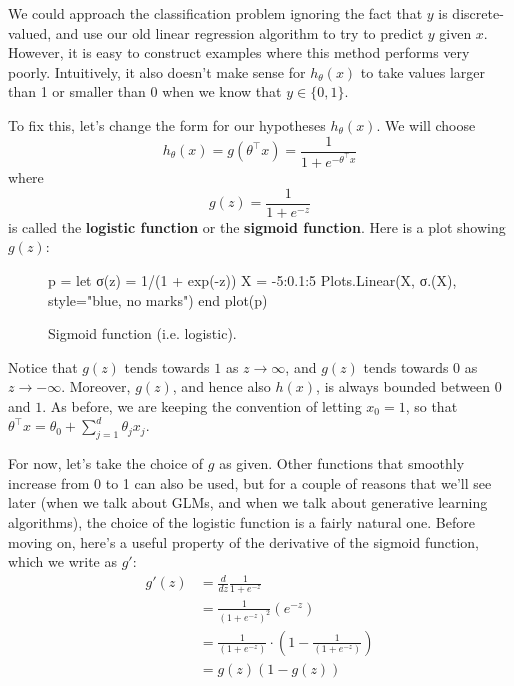 We could approach the classification problem ignoring the fact that $y$ is
discrete-valued, and use our old linear regression algorithm to try to predict
$y$ given $x$. However, it is easy to construct examples where this method
performs very poorly. Intuitively, it also doesn't make sense for $h_\theta (x)$ to take
values larger than 1 or smaller than 0 when we know that $y \in \{0,1\}$.

To fix this, let's change the form for our hypotheses $h_\theta (x)$. We will choose
\[
h_\theta (x) = g(\theta^\top x) = \frac{1}{1 + e^{-\theta^\top x}}
\]
where
\[
g(z) = \frac{1}{1 + e^{-z}}
\]
is called the \textbf{logistic function} or the \textbf{sigmoid function}. Here is a plot
showing $g(z)$:

\begin{figure}
    \caption{
        \label{fig:sigmoid} Sigmoid function (i.e. logistic).
    }
    \begin{jlcode}
    p = let
        σ(z) = 1/(1 + exp(-z))
        X = -5:0.1:5
        Plots.Linear(X, σ.(X), style="blue, no marks")
    end
    plot(p)
    \end{jlcode}
    \begin{center}
    \end{center}
\end{figure}

Notice that $g(z)$ tends towards $1$ as $z \to \infty$, and $g(z)$ tends towards $0$ as
$z \to -\infty$. Moreover, $g(z)$, and hence also $h(x)$, is always bounded between
$0$ and $1$. As before, we are keeping the convention of letting $x_0 = 1$, so that $\theta^\top x = \theta_0 + \sum_{j=1}^{d} \theta_j x_j$.

For now, let's take the choice of $g$ as given. Other functions that smoothly
increase from 0 to 1 can also be used, but for a couple of reasons that we'll see
later (when we talk about GLMs, and when we talk about generative learning
algorithms), the choice of the logistic function is a fairly natural one. Before
moving on, here's a useful property of the derivative of the sigmoid function,
which we write as $g'$:
\begin{align}
    g'(z) &= \frac{d}{dz}\frac{1}{1 + e^{-z}}\\
    &= \frac{1}{(1 + e^{-z})^2} (e^{-z})\\
    &= \frac{1}{(1 + e^{-z})} \cdot \left( 1 - \frac{1}{(1 + e^{-z})} \right)\\
    &= g(z)(1 - g(z))
\end{align}

